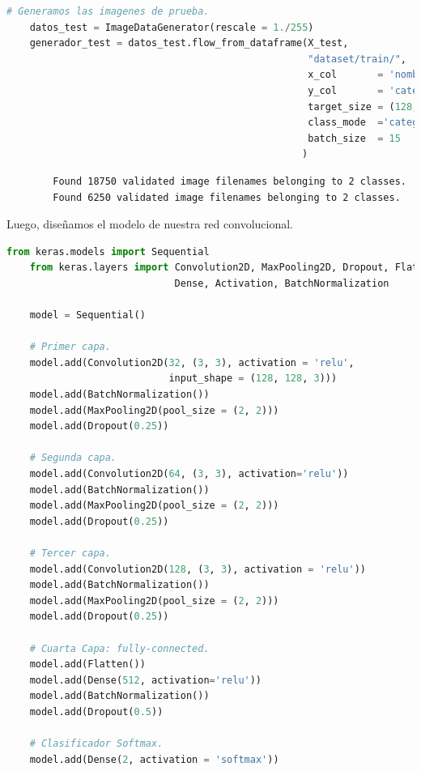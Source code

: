 \documentclass[letterpaper,11pt]{article}
\begin{document}
\begin{enumerate}
\begin{lstlisting}[language=Python]
    # Generamos las imagenes de prueba.
    datos_test = ImageDataGenerator(rescale = 1./255)
    generador_test = datos_test.flow_from_dataframe(X_test, 
                                                    "dataset/train/", 
                                                    x_col       = 'nombre',
                                                    y_col       = 'categoria',
                                                    target_size = (128, 128),
                                                    class_mode  ='categorical',
                                                    batch_size  = 15
                                                   )
    \end{lstlisting}

    \begin{verbatim}
        Found 18750 validated image filenames belonging to 2 classes.
        Found 6250 validated image filenames belonging to 2 classes.

    \end{verbatim}

    Luego, diseñamos el modelo de nuestra red convolucional.
    \begin{lstlisting}[language=Python]
    from keras.models import Sequential
    from keras.layers import Convolution2D, MaxPooling2D, Dropout, Flatten, 
                             Dense, Activation, BatchNormalization

    model = Sequential()

    # Primer capa. 
    model.add(Convolution2D(32, (3, 3), activation = 'relu', 
                            input_shape = (128, 128, 3)))
    model.add(BatchNormalization())
    model.add(MaxPooling2D(pool_size = (2, 2)))
    model.add(Dropout(0.25))

    # Segunda capa.
    model.add(Convolution2D(64, (3, 3), activation='relu'))
    model.add(BatchNormalization())
    model.add(MaxPooling2D(pool_size = (2, 2)))
    model.add(Dropout(0.25))

    # Tercer capa.
    model.add(Convolution2D(128, (3, 3), activation = 'relu'))
    model.add(BatchNormalization())
    model.add(MaxPooling2D(pool_size = (2, 2)))
    model.add(Dropout(0.25))

    # Cuarta Capa: fully-connected. 
    model.add(Flatten())
    model.add(Dense(512, activation='relu'))
    model.add(BatchNormalization())
    model.add(Dropout(0.5))

    # Clasificador Softmax.
    model.add(Dense(2, activation = 'softmax'))
    \end{lstlisting}


\end{enumerate}
\end{document}
